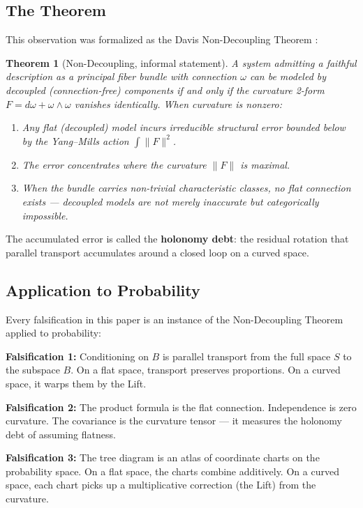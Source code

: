 \documentclass[12pt]{article}
\newtheorem{theorem}{Theorem}
\begin{document}
\subsection{The Theorem}

This observation was formalized as the Davis Non-Decoupling Theorem \cite{davis2026nondecoupling}:

\begin{theorem}[Non-Decoupling, informal statement]
A system admitting a faithful description as a principal fiber bundle with connection $\omega$ can be modeled by decoupled (connection-free) components if and only if the curvature 2-form $F = d\omega + \omega \wedge \omega$ vanishes identically. When curvature is nonzero:
\begin{enumerate}[nosep]
\item Any flat (decoupled) model incurs irreducible structural error bounded below by the Yang--Mills action $\int \|F\|^2$.
\item The error concentrates where the curvature $\|F\|$ is maximal.
\item When the bundle carries non-trivial characteristic classes, no flat connection exists --- decoupled models are not merely inaccurate but categorically impossible.
\end{enumerate}
\end{theorem}

The accumulated error is called the \textbf{holonomy debt}: the residual rotation that parallel transport accumulates around a closed loop on a curved space.

\subsection{Application to Probability}

Every falsification in this paper is an instance of the Non-Decoupling Theorem applied to probability:

\textbf{Falsification 1:} Conditioning on $B$ is parallel transport from the full space $S$ to the subspace $B$. On a flat space, transport preserves proportions. On a curved space, it warps them by the Lift.

\textbf{Falsification 2:} The product formula is the flat connection. Independence is zero curvature. The covariance is the curvature tensor --- it measures the holonomy debt of assuming flatness.

\textbf{Falsification 3:} The tree diagram is an atlas of coordinate charts on the probability space. On a flat space, the charts combine additively. On a curved space, each chart picks up a multiplicative correction (the Lift) from the curvature.
\end{document}
